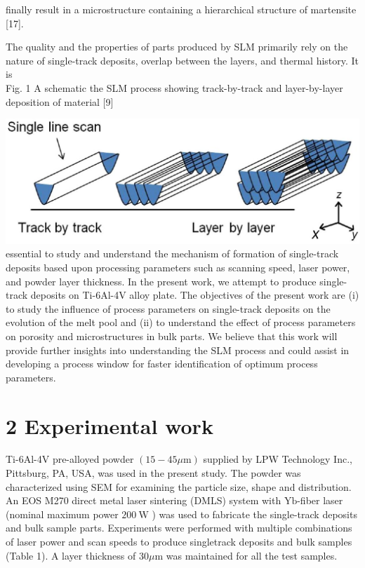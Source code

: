 \documentclass[10pt]{article}
\begin{document}
finally result in a microstructure containing a hierarchical structure of martensite [17].

The quality and the properties of parts produced by SLM primarily rely on the nature of single-track deposits, overlap between the layers, and thermal history. It is\\
Fig. 1 A schematic the SLM process showing track-by-track and layer-by-layer deposition of material [9]

\includegraphics[max width=\textwidth, center]{2024_02_28_5b6806184856c64a957ag-02}\\
essential to study and understand the mechanism of formation of single-track deposits based upon processing parameters such as scanning speed, laser power, and powder layer thickness. In the present work, we attempt to produce single-track deposits on Ti-6Al-4V alloy plate. The objectives of the present work are (i) to study the influence of process parameters on single-track deposits on the evolution of the melt pool and (ii) to understand the effect of process parameters on porosity and microstructures in bulk parts. We believe that this work will provide further insights into understanding the SLM process and could assist in developing a process window for faster identification of optimum process parameters.

\section*{2 Experimental work}
Ti-6Al-4V pre-alloyed powder $(15-45 \mu \mathrm{m})$ supplied by LPW Technology Inc., Pittsburg, PA, USA, was used in the present study. The powder was characterized using SEM for examining the particle size, shape and distribution. An EOS M270 direct metal laser sintering (DMLS) system with $\mathrm{Yb}$-fiber laser (nominal maximum power $200 \mathrm{~W}$ ) was used to fabricate the single-track deposits and bulk sample parts. Experiments were performed with multiple combinations of laser power and scan speeds to produce singletrack deposits and bulk samples (Table 1). A layer thickness of $30 \mu \mathrm{m}$ was maintained for all the test samples.
\end{document}
